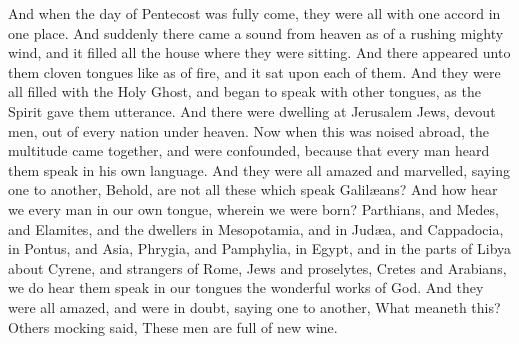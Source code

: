  And when the day of Pentecost was fully come, they were all
with one accord in one place.  And suddenly there came a
sound from heaven as of a rushing mighty wind, and it filled all the
house where they were sitting.  And there appeared unto them
cloven tongues like as of fire, and it sat upon each of them.
 And they were all filled with the Holy Ghost, and began to
speak with other tongues, as the Spirit gave them utterance.
 And there were dwelling at Jerusalem Jews, devout men, out
of every nation under heaven.  Now when this was noised
abroad, the multitude came together, and were confounded, because that
every man heard them speak in his own language.  And they
were all amazed and marvelled, saying one to another, Behold, are not
all these which speak Galilæans?  And how hear we every man
in our own tongue, wherein we were born?  Parthians, and
Medes, and Elamites, and the dwellers in Mesopotamia, and in Judæa, and
Cappadocia, in Pontus, and Asia,  Phrygia, and Pamphylia,
in Egypt, and in the parts of Libya about Cyrene, and strangers of Rome,
Jews and proselytes,  Cretes and Arabians, we do hear them
speak in our tongues the wonderful works of God.  And they
were all amazed, and were in doubt, saying one to another, What meaneth
this?  Others mocking said, These men are full of new wine.

